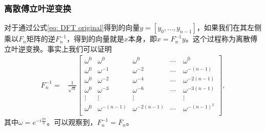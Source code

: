 \documentclass[10pt]{beamer}
\begin{document}
\begin{frame}
\frametitle{离散傅立叶逆变换}
对于通过公式\eqref{eq: DFT original}得到的向量$y = [y_0, \ldots, y_{n-1}]$，如果我们在其左侧乘以$F_n$矩阵的逆$F_n^{-1}$，得到的向量就是$x$本身，即$x = F_n^{-1} y$。这个过程称为离散傅立叶逆变换。事实上我们可以证明
\begin{align}
F^{-1}_n = & \frac{1}{\sqrt{n}} \left[ \begin{array}{ccccc}
     \omega^0    &  \omega^0 &  \omega^0 & \cdots &  \omega^0  \\
     \omega^0    &  \omega^{-1} &  \omega^{-2} & \cdots &  \omega^{-(n-1)}  \\
     \omega^0    &  \omega^{-2} &  \omega^{-4} & \cdots &  \omega^{-2(n-1)}  \\
     \omega^0    &  \omega^{-3} &  \omega^{-6} & \cdots &  \omega^{-3(n-1)}  \\
     \vdots    &  \vdots & \vdots &\quad &  \vdots  \\
     \omega^0    &  \omega^{-(n-1)} &  \omega^{-2(n-1)} & \cdots &  \omega^{-(n-1)^2}  \\                   
            \end{array} \right] ,
\end{align}
其中$\omega = e^{-i \frac{2\pi}{n}}$。可以观察到，$F_n^{-1} = \overline{F}_n$。
\end{frame}
\end{document}
